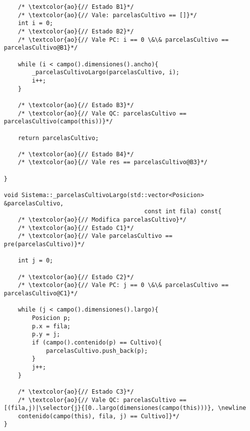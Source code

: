 \begin{lstlisting}
	/* \textcolor{ao}{// Estado B1}*/	    
    /* \textcolor{ao}{// Vale: parcelasCultivo == []}*/    
    int i = 0;
	/* \textcolor{ao}{// Estado B2}*/	    
    /* \textcolor{ao}{// Vale PC: i == 0 \&\& parcelasCultivo == parcelasCultivo@B1}*/    
        
    while (i < campo().dimensiones().ancho){
        _parcelasCultivoLargo(parcelasCultivo, i);
        i++;
    }
    
    /* \textcolor{ao}{// Estado B3}*/	    
    /* \textcolor{ao}{// Vale QC: parcelasCultivo == parcelasCultivo(campo(this))}*/    
    
    return parcelasCultivo;
    
    /* \textcolor{ao}{// Estado B4}*/	    
    /* \textcolor{ao}{// Vale res == parcelasCultivo@B3}*/    
    
}

void Sistema::_parcelasCultivoLargo(std::vector<Posicion> &parcelasCultivo,
										const int fila) const{
	/* \textcolor{ao}{// Modifica parcelasCultivo}*/	        
    /* \textcolor{ao}{// Estado C1}*/	    
    /* \textcolor{ao}{// Vale parcelasCultivo == pre(parcelasCultivo)}*/      
    
    int j = 0;
	
	/* \textcolor{ao}{// Estado C2}*/	    
    /* \textcolor{ao}{// Vale PC: j == 0 \&\& parcelasCultivo == parcelasCultivo@C1}*/      
    
    while (j < campo().dimensiones().largo){
        Posicion p;
        p.x = fila;
        p.y = j;
        if (campo().contenido(p) == Cultivo){
            parcelasCultivo.push_back(p);
        }
        j++;
    }
	
	/* \textcolor{ao}{// Estado C3}*/	    
    /* \textcolor{ao}{// Vale QC: parcelasCultivo == [(fila,j)|\selector{j}{[0..largo(dimensiones(campo(this)))}, \newline
    contenido(campo(this), fila, j) == Cultivo]}*/      
}


\end{lstlisting}